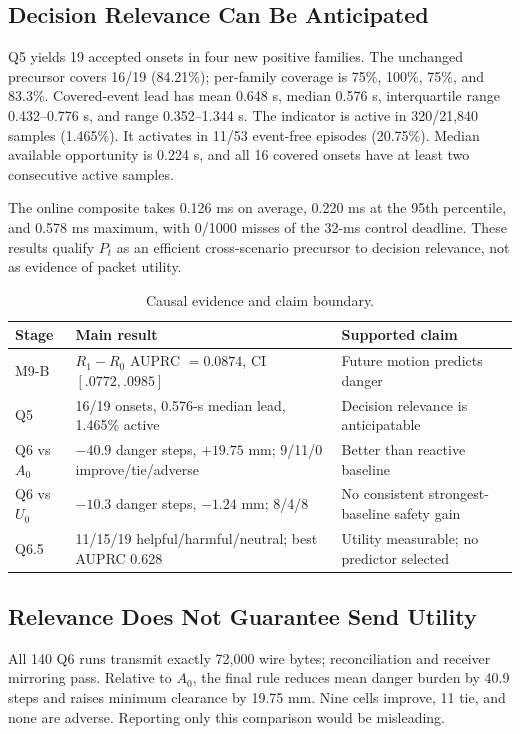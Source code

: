 \documentclass[letterpaper,10pt,conference]{ieeeconf}
\begin{document}
\subsection{Decision Relevance Can Be Anticipated}
Q5 yields 19 accepted onsets in four new positive families. The unchanged
precursor covers 16/19 (84.21\%); per-family coverage is 75\%, 100\%, 75\%,
and 83.3\%. Covered-event lead has mean 0.648 s, median 0.576 s, interquartile
range 0.432--0.776 s, and range 0.352--1.344 s. The indicator is active in
320/21,840 samples (1.465\%). It activates in 11/53 event-free episodes
(20.75\%). Median available opportunity is 0.224 s, and all 16 covered onsets
have at least two consecutive active samples.

The online composite takes 0.126 ms on average, 0.220 ms at the 95th
percentile, and 0.578 ms maximum, with 0/1000 misses of the 32-ms control
deadline. These results qualify $P_t$ as an efficient cross-scenario precursor
to decision relevance, not as evidence of packet utility.

\begin{table}[t]
\centering
\caption{Causal evidence and claim boundary.}
\label{tab:results}
\footnotesize
\setlength{\tabcolsep}{3.2pt}
\begin{tabular}{@{}p{}p{}p{}@{}}
\toprule
Stage & Main result & Supported claim \\
\midrule
M9-B & $R_1-R_0$ AUPRC $=0.0874$, CI $[.0772,.0985]$ & Future motion predicts danger \\
Q5 & 16/19 onsets, 0.576-s median lead, 1.465\% active & Decision relevance is anticipatable \\
Q6 vs $A_0$ & $-40.9$ danger steps, $+19.75$ mm; 9/11/0 improve/tie/adverse & Better than reactive baseline \\
Q6 vs $U_0$ & $-10.3$ danger steps, $-1.24$ mm; 8/4/8 & No consistent strongest-baseline safety gain \\
Q6.5 & 11/15/19 helpful/harmful/neutral; best AUPRC 0.628 & Utility measurable; no predictor selected \\
\bottomrule
\end{tabular}
\end{table}

\subsection{Relevance Does Not Guarantee Send Utility}
All 140 Q6 runs transmit exactly 72,000 wire bytes; reconciliation and receiver
mirroring pass. Relative to $A_0$, the final rule reduces mean danger burden by
40.9 steps and raises minimum clearance by 19.75 mm. Nine cells improve, 11
tie, and none are adverse. Reporting only this comparison would be misleading.
\end{document}
